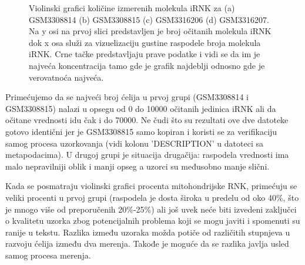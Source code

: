 \documentclass{article}
\begin{document}
\begin{figure}[!h]
    \centering
    \caption{ Violinski grafici količine izmerenih molekula iRNK za (a) GSM3308814 (b) GSM3308815 (c) GSM3316206 (d) GSM3316207. Na y osi na prvoj slici predstavljen je broj očitanih molekula iRNK dok x osa služi za vizuelizaciju gustine raspodele broja molekula iRNK. Crne tačke predstavljaju prave podatke i vidi se da im je najveća koncentracija tamo gde je grafik najdeblji odnosno gde je verovatnoća najveća. }
    \label{fig:n_counts_violin}
\end{figure}

Primećujemo da se najveći broj ćelija u prvoj grupi (GSM3308814 i GSM3308815) nalazi u opsegu od 0 do 10000 očitanih jedinica iRNK ali da očitane vrednosti idu čak i do 70000. Ne čudi što su rezultati ove dve datoteke gotovo identični jer je GSM3308815 samo kopiran i koristi se za verifikaciju samog procesa uzorkovanja (vidi kolonu 'DESCRIPTION' u datoteci sa metapodacima). U drugoj grupi je situacija drugačija: raspodela vrednosti ima malo nepravilniji oblik i manji opseg a uzorci su međusobno manje slični.

Kada se posmatraju violinski grafici procenta mitohondrijske RNK, primećuju se veliki procenti u prvoj grupi (raspodela je dosta široka u predelu od oko 40\%, što je mnogo više od preporučenih 20\%-25\%\cite{sstutorial}) ali još uvek neće biti izvedeni zaključci o kvalitetu uzorka zbog potencijalnih problema koji se mogu javiti i spomenuti su ranije u tekstu. Razlika između uzoraka možda potiče od različitih stupnjeva u razvoju ćelija između dva merenja. Takođe je moguće da se razlika javlja usled samog procesa merenja. 
\end{document}
